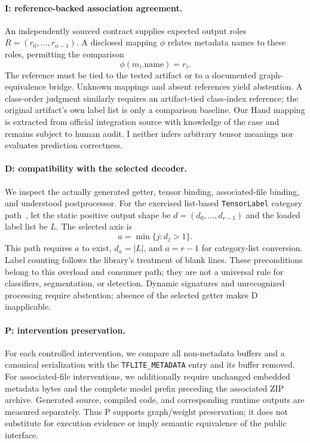 \documentclass[10pt,twocolumn,letterpaper]{article}
\newcommand{\code}[1]{\texttt{#1}}
\begin{document}
\paragraph{I: reference-backed association agreement.}
An independently sourced contract supplies expected output roles $R=(r_0,\ldots,r_{n-1})$. A disclosed mapping $\phi$ relates metadata names to these roles, permitting the comparison
\begin{equation}
\phi(m_i.\mathrm{name})=r_i.
\end{equation}
The reference must be tied to the tested artifact or to a documented graph-equivalence bridge. Unknown mappings and absent references yield abstention. A class-order judgment similarly requires an artifact-tied class-index reference; the original artifact's own label list is only a comparison baseline. Our Hand mapping is extracted from official integration source with knowledge of the case and remains subject to human audit. I neither infers arbitrary tensor meanings nor evaluates prediction correctness.

\paragraph{D: compatibility with the selected decoder.}
We inspect the actually generated getter, tensor binding, associated-file binding, and understood postprocessor. For the exercised list-based \code{TensorLabel} category path~\cite{tensorlabel}, let the static positive output shape be $d=(d_0,\ldots,d_{r-1})$ and the loaded label list be $L$. The selected axis is
\begin{equation}
a=\min\{j:d_j>1\}.
\end{equation}
This path requires $a$ to exist, $d_a=|L|$, and $a=r-1$ for category-list conversion. Label counting follows the library's treatment of blank lines. These preconditions belong to this overload and consumer path; they are not a universal rule for classifiers, segmentation, or detection. Dynamic signatures and unrecognized processing require abstention; absence of the selected getter makes D inapplicable.

\paragraph{P: intervention preservation.}
For each controlled intervention, we compare all non-metadata buffers and a canonical serialization with the \code{TFLITE\_METADATA} entry and its buffer removed. For associated-file interventions, we additionally require unchanged embedded metadata bytes and the complete model prefix preceding the associated ZIP archive. Generated source, compiled code, and corresponding runtime outputs are measured separately. Thus P supports graph/weight preservation; it does not substitute for execution evidence or imply semantic equivalence of the public interface.
\end{document}
